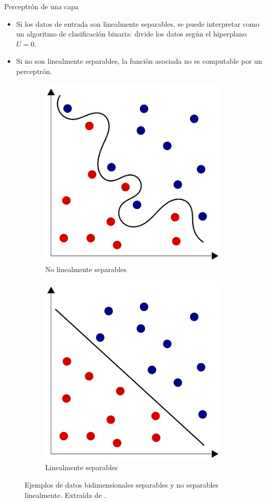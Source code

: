 \documentclass[spanish]{beamer}
\begin{document}
\begin{frame}{Perceptrón de una capa}
  \begin{itemize}
    \item Si los datos de entrada son linealmente separables, se puede interpretar como un algoritmo de clasificación binaria: divide los datos según el hiperplano $U=0$.
    \item Si no son linealmente separables, la función asociada no es computable por un perceptrón.
  \end{itemize}
  \vspace{1em}

\begin{figure}[h]
  \centering
  \begin{subfigure}[b]{0.4\textwidth}
    \centering
    \includegraphics[width=.6\textwidth]{img/non-separable}
    \caption{No linealmente separables}
  \end{subfigure}
  \qquad
  \begin{subfigure}[b]{0.4\textwidth}
    \centering
    \includegraphics[width=.6\textwidth]{img/separable}
    \caption{Linealmente separables}
  \end{subfigure}
  \caption{Ejemplos de datos bidimensionales separables y no separables linealmente. Extraída de \parencite{wikipedia_separable}.}
  \label{fig:separable}
\end{figure}
\end{frame}
\end{document}
